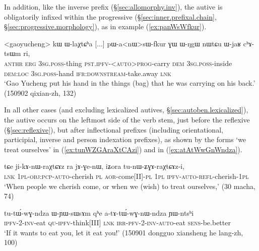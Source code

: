 In addition, like the inverse prefix (§\ref{sec:allomorphy.inv}), the autive is obligatorily infixed within the progressive  (§\ref{sec:inner.prefixal.chain}, §\ref{sec:progressive.morphology}), as in example (\ref{ex:panWsWfkur}). 

 \begin{exe}
\ex \label{ex:panWsWfkur}
\gll <gaoyucheng> kɯ ɯ-laχtɕʰa [...] pɯ-a<nɯ>sɯ-fkur ɣɯ ɯ-ŋgɯ nɯtɕu ɯ-jaʁ cʰɤ-tsɯm ri,\\
\textsc{anthr} \textsc{erg} \textsc{3sg}.\textsc{poss}-thing { } \textsc{pst}.\textsc{ipfv}-<\textsc{auto}>\textsc{prog}-carry \textsc{dem} \textsc{3sg}.\textsc{poss}-inside \textsc{dem}:\textsc{loc} \textsc{3sg}.\textsc{poss}-hand \textsc{ifr}:\textsc{downstream}-take.away \textsc{lnk}\\
\glt `Gao Yucheng put his hand in the things (bag) that he was carrying on his back.' (150902 qixian-zh, 132)
\end{exe}

In all other cases (and excluding lexicalized autives, §\ref{sec:autoben.lexicalized}), the autive  occurs on the leftmost side of the verb stem, just before the reflexive (§\ref{sec:reflexive}), but after inflectional prefixes (including orientational, participial, inverse and person indexation prefixes), as shown by the forms  `we treat ourselves' in (\ref{ex:tunWZGAraXtCAzi}) and  in (\ref{ex:atAtWwGnWndza}).

\begin{exe}
\ex \label{ex:tunWZGAraXtCAzi}
\gll  tɕe ji-kɤ-nɯ-raχtɕɤz ra jɤ-ɣe-nɯ, iʑora tu-nɯ-ʑɣɤ-raχtɕɤz-i,  \\
\textsc{lnk} \textsc{1pl}-\textsc{obj}:\textsc{pcp}-\textsc{auto}-cherish \textsc{pl} \textsc{aor}-come[II]-\textsc{pl} \textsc{1pl} \textsc{ipfv}-\textsc{auto}-\textsc{refl}-cherish-\textsc{1pl} \\
\glt `When people we cherish come, or when we (wish) to treat ourselves,' (30 macha, 74)
\end{exe}

\begin{exe}
\ex \label{ex:atAtWwGnWndza}
\gll tu-tɯ́-wɣ-ndza ɯ-ɲɯ-sɯsɤm qʰe a-tɤ-tɯ́-wɣ-nɯ-ndza ɲɯ-ntsʰi \\
\textsc{ipfv}-2-\textsc{inv}-eat \textsc{qu}-\textsc{ipfv}-think[III] \textsc{lnk} \textsc{irr}-\textsc{pfv}-2-\textsc{inv}-\textsc{auto}-eat \textsc{sens}-be.better \\
\glt  `If it wants to eat you, let it eat you!'  (150901 dongguo xiansheng he lang-zh, 100)
\end{exe}

